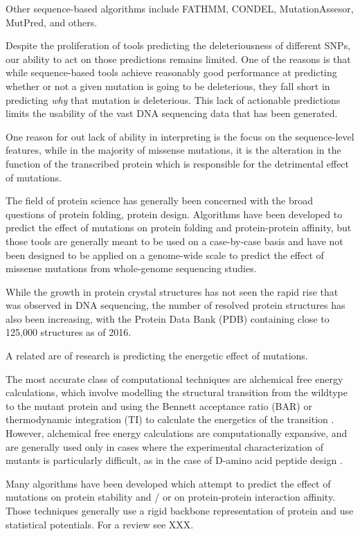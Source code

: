 Other sequence-based algorithms include FATHMM, CONDEL, MutationAssesor, MutPred, and others.

Despite the proliferation of tools predicting the deleteriousness of different SNPs, our ability to act on those predictions remains limited. One of the reasons is that while sequence-based tools achieve reasonably good performance at predicting whether or not a given mutation is going to be deleterious, they fall short in predicting \textit{why} that mutation is deleterious. This lack of actionable predictions limits the usability of the vast DNA sequencing data that has been generated.


One reason for out lack of ability in interpreting is the focus on the sequence-level features, while in the majority of missense mutations, it is the alteration in the function of the transcribed protein which is responsible for the detrimental effect of mutations.

The field of protein science has generally been concerned with the broad questions of protein folding, protein design. Algorithms have been developed to predict the effect of mutations on protein folding and protein-protein affinity, but those tools are generally meant to be used on a case-by-case basis and have not been designed to be applied on a genome-wide scale to predict the effect of missense mutations from whole-genome sequencing studies.

While the growth in protein crystal structures has not seen the rapid rise that was observed in DNA sequencing, the number of resolved protein structures has also been increasing, with the Protein Data Bank (PDB) containing close to 125,000 structures as of 2016.

A related are of research is predicting the energetic effect of mutations.

The most accurate class of computational techniques are alchemical free energy calculations, which involve modelling the structural transition from the wildtype to the mutant protein and using the Bennett acceptance ratio (BAR) or thermodynamic integration (TI) to calculate the energetics of the transition \cite{monticelli_introduction_2013}. However, alchemical free energy calculations are computationally expansive, and are generally used only in cases where the experimental characterization of mutants is particularly difficult, as in the case of D-amino acid peptide design \cite{welch_potent_2007}.

Many algorithms have been developed which attempt to predict the effect of mutations on protein stability and / or on protein-protein interaction affinity. Those techniques generally use a rigid backbone representation of protein and use statistical potentials. For a review see XXX.

